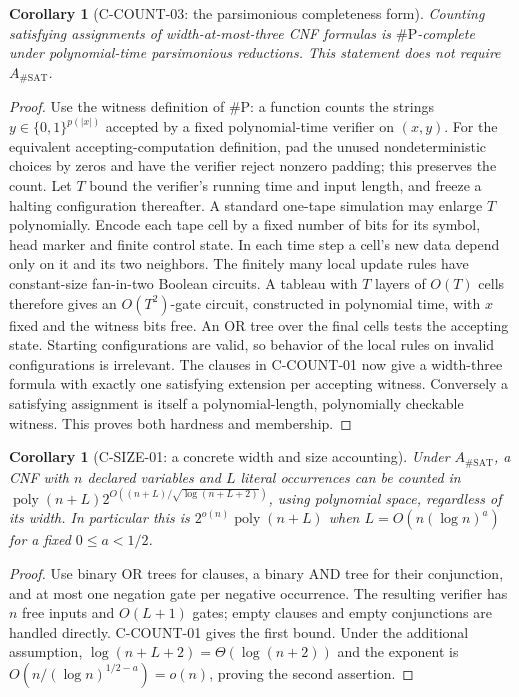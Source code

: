 \documentclass[11pt,a4paper]{article}
\newtheorem{corollary}[proposition]{Corollary}
\begin{document}
\begin{corollary}[C-COUNT-03: the parsimonious completeness form]
Counting satisfying assignments of width-at-most-three CNF formulas is
\(\#\mathrm P\)-complete under polynomial-time parsimonious reductions.
This statement does not require \(A_{\#\mathrm{SAT}}\).
\end{corollary}
\begin{proof}
Use the witness definition of \(\#\mathrm P\): a function counts the
strings \(y\in\{0,1\}^{p(|x|)}\) accepted by a fixed polynomial-time
verifier on \((x,y)\).  For the equivalent accepting-computation
definition, pad the unused nondeterministic choices by zeros and have
the verifier reject nonzero padding; this preserves the count.
Let \(T\) bound the verifier's running time and input length, and freeze a halting
configuration thereafter.  A standard one-tape simulation may enlarge
\(T\) polynomially.  Encode each tape cell by a fixed number of bits
for its symbol, head marker and finite control state.  In each time
step a cell's new data depend only on it and its two neighbors.
The finitely many local update rules have constant-size fan-in-two
Boolean circuits.  A tableau with \(T\) layers of \(O(T)\) cells
therefore gives an \(O(T^2)\)-gate circuit, constructed in polynomial
time, with \(x\) fixed and the witness bits free.  An OR tree over
the final cells tests the accepting state.  Starting configurations
are valid, so behavior of the local rules on invalid configurations
is irrelevant.  The clauses in C-COUNT-01 now give a width-three
formula with exactly one satisfying extension per accepting witness.
Conversely a satisfying assignment is itself a polynomial-length,
polynomially checkable witness.  This proves both hardness and membership.
\end{proof}

\begin{corollary}[C-SIZE-01: a concrete width and size accounting]
Under \(A_{\#\mathrm{SAT}}\), a CNF with \(n\) declared variables and
\(L\) literal occurrences can be counted in
\(\operatorname{poly}(n+L)2^{O((n+L)/\sqrt{\log(n+L+2)})}\), using
polynomial space, regardless of its width.  In particular this is
\(2^{o(n)}\operatorname{poly}(n+L)\) when
\(L=O(n(\log n)^a)\) for a fixed \(0\le a<1/2\).
\end{corollary}
\begin{proof}
Use binary OR trees for clauses, a binary AND tree for their conjunction,
and at most one negation gate per negative occurrence.  The resulting
verifier has \(n\) free inputs and \(O(L+1)\) gates; empty clauses and
empty conjunctions are handled directly.  C-COUNT-01 gives the first
bound.  Under the additional assumption,
\(\log(n+L+2)=\Theta(\log(n+2))\) and the exponent is
\(O(n/(\log n)^{1/2-a})=o(n)\), proving the second assertion.
\end{proof}
\end{document}
